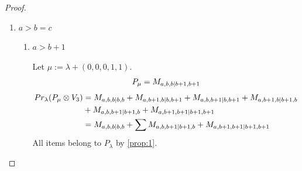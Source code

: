 \begin{proof}
\begin{enumerate}
\begin{enumerate}
\begin{table}[htbp]
\begin{tabular}{cc}
{$M_{c+2,c+3,c+2|c+2,c+3},
M_{c+2,c+2,c+1|c+1,c+2},
M_{c+2,c+3,c+1|c+1,c+3}$
  } \\
  $P_{c+3,c+2,c+1|c+3,c+1}$ &
  \makecell{
$M_{c+4,c+2,c+1|c+4,c+1},
M_{c+3,c+2,c+2|c+3,c+2},
M_{c+4,c+2,c+2|c+4,c+2},
M_{c+3,c+3,c+2|c+3,c+3},$ \\
$M_{c+4,c+2,c+1|c+1,c+4},
M_{c+3,c+2,c+2|c+2,c+3},
M_{c+4,c+2,c+2|c+2,c+4},$
  } \\
\bottomrule
\end{tabular}
\vspace{0.5em}
\parbox{\linewidth}{\small
\textbf{Interpretation:} 
This table displays only selected computational results. This partial presentation does not affect our conclusion.
}
\end{table}
    \end{enumerate}
    
  \item $a>b=c$
    \begin{enumerate}
      \item $a>b+1$ \par
      Let $\mu:=\lambda + (0,0,0,1,1) $. 
\begin{equation}\notag
  \begin{aligned}
      P_{\mu} = M_{a,b,b|b+1,b+1}
  \end{aligned}
\end{equation}
\begin{equation}\notag
  \begin{aligned}
    Pr_{\lambda}(P_\mu \otimes V_3) &=
M_{a,b,b|b,b}
+M_{a,b+1,b|b,b+1}
+M_{a,b,b+1|b,b+1}
+M_{a,b+1,b|b+1,b}\\
                                            &
+M_{a,b,b+1|b+1,b}
+M_{a,b+1,b+1|b+1,b+1} \\
                                    &=
 M_{a,b,b|b,b}
+\sum M_{a,b,b+1|b+1,b}
+ M_{a,b+1,b+1|b+1,b+1}
  \end{aligned}
\end{equation}
All items belong to $P_\lambda$ by \cref{prop:1}.


\end{enumerate}
\end{enumerate}
\end{proof}
